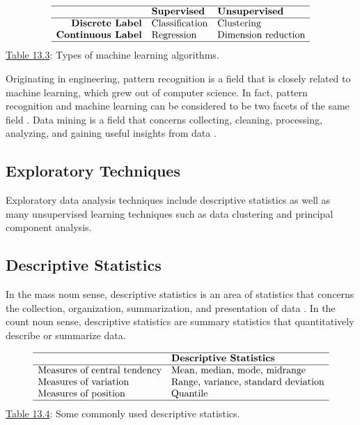 \documentclass[]{book}
\theoremstyle{definition}
\theoremstyle{definition}
\theoremstyle{definition}
\theoremstyle{remark}
\begin{document}
\[\begin{matrix}
\begin{array}{rll} \hline
& \textbf{Supervised} & \textbf{Unsupervised} \\\hline
\textbf{Discrete Label} & \text{Classification} & \text{Clustering} \\
\textbf{Continuous Label} & \text{Regression} & \text{Dimension reduction} \\
\hline
\end{array}
\end{matrix}
\] \protect\hyperlink{tab:13.3}{Table 13.3}: Types of machine learning
algorithms.

Originating in engineering, pattern recognition is a field that is
closely related to machine learning, which grew out of computer science.
In fact, pattern recognition and machine learning can be considered to
be two facets of the same field \citep{bishop2007}. Data mining is a
field that concerns collecting, cleaning, processing, analyzing, and
gaining useful insights from data \citep{aggarwal2015}.

\subsection{Exploratory Techniques}\label{exploratory-techniques}

Exploratory data analysis techniques include descriptive statistics as
well as many unsupervised learning techniques such as data clustering
and principal component analysis.

\subsection{Descriptive Statistics}\label{descriptive-statistics}

In the mass noun sense, descriptive statistics is an area of statistics
that concerns the collection, organization, summarization, and
presentation of data \citep{bluman2012}. In the count noun sense,
descriptive statistics are summary statistics that quantitatively
describe or summarize data.

\[\begin{matrix}
\begin{array}{ll} \hline
& \textbf{Descriptive Statistics} \\\hline
\text{Measures of central tendency} & \text{Mean, median, mode, midrange}\\
\text{Measures of variation} & \text{Range, variance, standard deviation} \\
\text{Measures of position} & \text{Quantile} \\
\hline
\end{array}
\end{matrix}
\] \protect\hyperlink{tab:13.4}{Table 13.4}: Some commonly used
descriptive statistics.
\end{document}
